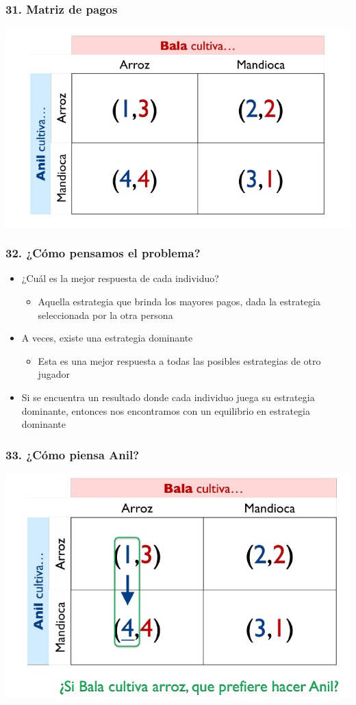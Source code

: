 \documentclass[14pt]{beamer}
\begin{document}
\begin{frame}
\frametitle{31. Matriz de pagos}
\centering
\includegraphics[scale=0.6]{Figures/Tema_03_12_bala.jpg}
\end{frame}

\begin{frame}
\frametitle{32. ¿Cómo pensamos el problema?}
\begin{itemize}
    \item ¿Cuál es la mejor respuesta de cada individuo?
        \begin{itemize}
        \item Aquella estrategia que brinda los mayores pagos, dada la estrategia seleccionada por la otra persona
        \end{itemize}
    \item A veces, existe una estrategia dominante
        \begin{itemize}
        \item Esta es una mejor respuesta a todas las posibles estrategias de otro jugador
        \end{itemize}
    \item Si se encuentra un resultado donde cada individuo juega su estrategia dominante, entonces nos encontramos con un equilibrio en estrategia dominante
\end{itemize}
\end{frame}

\begin{frame}
\frametitle{33. ¿Cómo piensa Anil?}
\centering
\includegraphics[scale=0.6]{Figures/Tema_03_13_bala.jpg}
\end{frame}
\end{document}
